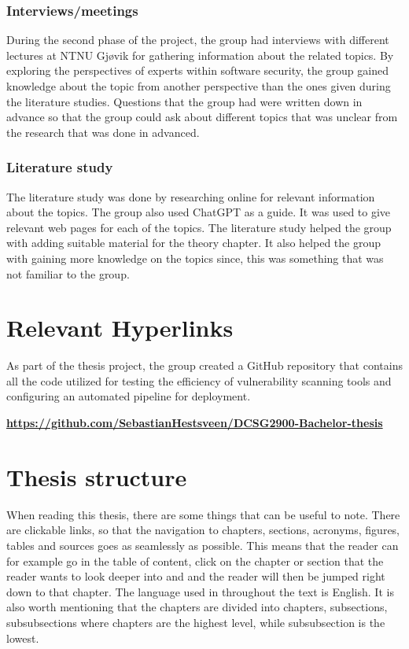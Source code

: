 \subsubsection{Interviews/meetings}
During the second phase of the project, the group had interviews with different lectures at NTNU Gjøvik for gathering information about the related topics. By exploring the perspectives of experts within software security, the group gained knowledge about the topic from another perspective than the ones given during the literature studies. Questions that the group had were written down in advance so that the group could ask about different topics that was unclear from the research that was done in advanced.   

\subsubsection{Literature study}
The literature study was done by researching online for relevant information about the topics. The group also used ChatGPT as a guide. It was used to give relevant web pages for each of the topics. The literature study helped the group with adding suitable material for the theory chapter. It also helped the group with gaining more knowledge on the topics since, this was something that was not familiar to the group. 

\section{Relevant Hyperlinks}
As part of the thesis project, the group created a GitHub repository that contains all the code utilized for testing the efficiency of vulnerability scanning tools and configuring an automated pipeline for deployment. 

\href{https://github.com/SebastianHestsveen/DCSG2900-Bachelor-thesis}{\textbf{https://github.com/SebastianHestsveen/DCSG2900-Bachelor-thesis}}

\section{Thesis structure}
When reading this thesis, there are some things that can be useful to note. There are clickable links, so that the navigation to chapters, sections, acronyms, figures, tables and sources goes as seamlessly as possible. This means that the reader can for example go in the table of content, click on the chapter or section that the reader wants to look deeper into and and the reader will then be jumped right down to that chapter. The language used in throughout the text is English. It is also worth mentioning that the chapters are divided into chapters, subsections, subsubsections where chapters are the highest level, while subsubsection is the lowest. 
